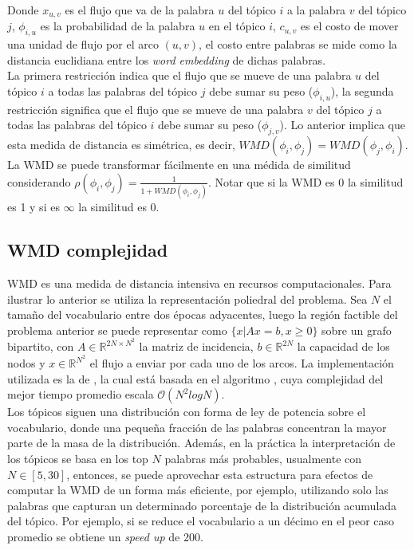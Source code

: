 Donde $x_{u,v}$ es el flujo que va de la palabra $u$ del tópico $i$ a la palabra $v$ del tópico $j$, $\phi_{i,u}$ es la probabilidad de la palabra $u$ en el tópico $i$, $c_{u,v}$ es el costo de mover una unidad de flujo por el arco $(u,v)$, el costo entre palabras se mide como la distancia euclidiana entre los \textit{word embedding} de dichas palabras.\\

La primera restricción indica que el flujo que se mueve de una palabra $u$ del tópico $i$ a todas las palabras del tópico $j$ debe sumar su peso ($\phi_{i,u}$), la segunda restricción significa que el flujo que se mueve de una palabra $v$ del tópico $j$ a todas las palabras del tópico $i$ debe sumar su peso ($\phi_{j,v}$). Lo anterior implica que esta medida de distancia es simétrica, es decir, $WMD(\phi_{i}, \phi_{j}) = WMD(\phi_{j}, \phi_{i})$.\\

La WMD se puede transformar fácilmente en una médida de similitud considerando $\rho(\phi_{i}, \phi_{j}) = \frac{1}{1+WMD(\phi_{i}, \phi_{j})}$. Notar que si la WMD es 0 la similitud es 1 y si es $\infty$ la similitud es 0. \\

\subsection{WMD complejidad}
\label{sec:wmd_complexity}

WMD es una medida de distancia intensiva en recursos computacionales. Para ilustrar lo anterior se utiliza la representación poliedral del problema. Sea $N$ el tamaño del vocabulario entre dos épocas adyacentes, luego la región factible del problema anterior se puede representar como $\{x| Ax=b, x\geq 0\}$ sobre un grafo bipartito, con $A\in \mathbb{R}^{2N\times N^{2}}$ la matriz de incidencia, $b\in \mathbb{R}^{2N}$ la capacidad de los nodos y $x\in \mathbb{R}^{N^{2}}$ el flujo a enviar por cada uno de los arcos. La implementación utilizada es la de \citep{PyEMD}, la cual está basada en el algoritmo \citep{pele2009fast}, cuya complejidad del mejor tiempo promedio escala $\mathcal{O}(N^{2}log N)$.\\

Los tópicos siguen una distribución con forma de ley de potencia sobre el vocabulario, donde una pequeña fracción de las palabras concentran la mayor parte de la masa de la distribución. Además, en la práctica la interpretación de los tópicos se basa en los top $N$ palabras más probables, usualmente con $N \in [5, 30]$, entonces, se puede aprovechar esta estructura para efectos de computar la WMD de un forma más eficiente, por ejemplo, utilizando solo las palabras que capturan un determinado porcentaje de la distribución acumulada del tópico. Por ejemplo, si se reduce el vocabulario a un décimo en el peor caso promedio se obtiene un \textit{speed up} de 200.\\

